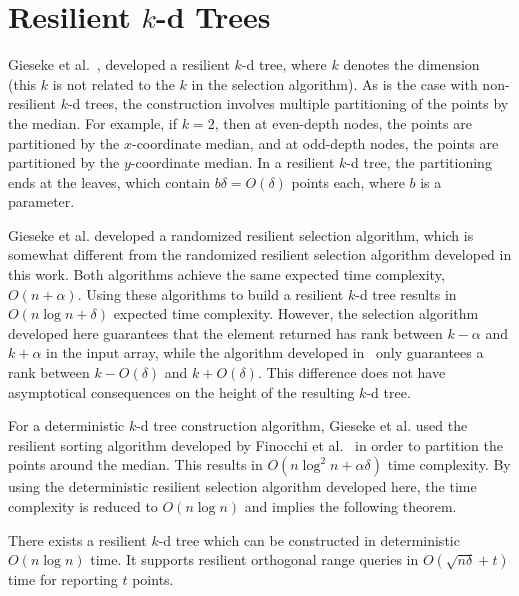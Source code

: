 \documentclass{llncs}
\begin{document}
\section{Resilient $k$-d Trees}
\label{sec:resilient_kd_trees}

Gieseke et al.~\cite{kd_trees}, developed a resilient $k$-d tree, where $k$ denotes the dimension (this $k$ is not related to the $k$ in the selection algorithm). As is the case with non-resilient $k$-d trees,
the construction involves multiple partitioning of the points by the median.
For example, if $k = 2$, then at even-depth nodes, the points are partitioned by the $x$-coordinate median,
and at odd-depth nodes, the points are partitioned by the $y$-coordinate median.
In a resilient $k$-d tree, the partitioning ends at the leaves, which contain $b \delta = O(\delta)$ points each,
where $b$ is a parameter.

Gieseke et al. developed a randomized resilient selection algorithm, which is somewhat different
from the randomized resilient selection algorithm developed in this work.
Both algorithms achieve the same expected time complexity, $O(n + \alpha)$.
Using these algorithms to build a resilient $k$-d tree results in $O(n \log n + \delta)$ expected time complexity.
However, the selection algorithm developed here guarantees that the element returned has rank
between $k - \alpha$ and $k + \alpha$ in the input array,
while the algorithm developed in~\cite{kd_trees} only guarantees a rank between $k - O(\delta)$ and $k + O(\delta)$.
This difference does not have asymptotical consequences on the height of the resulting $k$-d tree.

For a deterministic $k$-d tree construction algorithm, Gieseke et al. used the resilient sorting algorithm
developed by Finocchi et al.~\cite{resilient_sorting} in order to partition the points around the median.
This results in $O(n \log^2 n + \alpha\delta)$ time complexity.
By using the deterministic resilient selection algorithm developed here,
the time complexity is reduced to $O(n \log n)$ and implies the following theorem.

\begin{theorem}\label{theorem:kd_trees}
There exists a resilient $k$-d tree which can be constructed in deterministic $O(n \log n)$ time.
It supports resilient orthogonal range queries in $O(\sqrt{n \delta} + t)$ time for reporting $t$ points.
\end{theorem}
\end{document}

